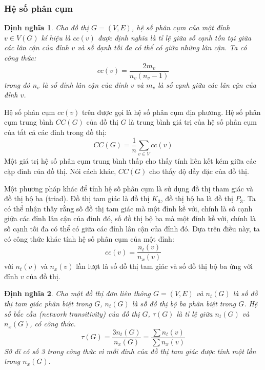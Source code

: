 \documentclass[14pt, oneside, a4paper, openany]{scrartcl}
\newtheorem{definition}{Định nghĩa}[section]
\begin{document}
\subsubsection{Hệ số phân cụm}
\begin{definition}
	\cite{complexnetwork}Cho đồ thị $G = (V,E)$, hệ số phân cụm  của một đỉnh $v \in V(G)$ kí hiệu là $cc(v)$ được định nghĩa là tỉ lệ giữa số cạnh tồn tại giữa các lân cận của đỉnh $v$ và số dạnh tối đa có thể có giữa những lân cận. Ta có công thức:
	\begin{equation}
		cc(v) = \frac{2m_v}{n_v(n_v-1)}
	\end{equation}
	trong đó $n_v$ là số đỉnh lân cận của đỉnh $v$ và $m_v$ là số cạnh giữa các lân cận của đỉnh $v$.
\end{definition}

Hệ số phân cụm $cc(v)$ trên được gọi là hệ số phân cụm địa phương. Hệ số phân cụm trung bình $CC(G)$ của đồ thị $G$ là trung bình giá trị của hệ số phân cụm của tất cả các đỉnh trong đồ thị:
\begin{equation}
	CC(G) = \frac{1}{n}\sum_{v \in V}cc(v)
\end{equation}
Một giá trị hệ số phân cụm trung bình thấp cho thấy tính liên kết kém giữa các cặp đỉnh của đồ thị. Nói cách khác, $CC(G)$ cho thấy độ dầy đặc của đồ thị.

Một phương pháp khác để tính hệ số phân cụm là sử dụng đồ thị tham giác và đồ thị bộ ba (triad). Đồ thị tam giác là đồ thị $K_3$, đồ thị bộ ba là đồ thị $P_3$. Ta có thể nhận thấy rằng số đồ thị tam giác mà một đỉnh kề với, chính là số cạnh giữa các đỉnh lân cận của đỉnh đó, số đồ thị bộ ba mà một đỉnh kề với, chính là số cạnh tối đa có thể có giữa các đỉnh lân cận của đỉnh đó.
Dựa trên điều này, ta có công thức khác tính hệ số phân cụm của một đỉnh:
\begin{equation}
	cc(v) = \frac{n_t(v)}{n_x(v)}
\end{equation}
với $n_t(v)$ và $n_x(v)$ lần lượt là số đồ thị tam giác và số đồ thị bộ ba ứng với đỉnh $v$ của đồ thị.

\begin{definition}
	\cite{complexnetwork} Cho một đồ thị đơn liên thông $G = (V,E)$ và $n_t(G)$ là số đồ thị tam giác phân biệt trong $G$, $n_t(G)$ là số đồ thị bộ ba phân biệt trong $G$. Hệ số bắc cầu  (network transitivity) của đồ thị $G$, $\tau(G)$ là tỉ lệ giữa $n_t(G)$ và $n_x(G)$, có công thức.
	\begin{equation}
		\tau(G) = \frac{3n_t(G)}{n_x(G)} = \frac{\sum n_t(v)}{\sum n_x(v)}
	\end{equation}
	Sở dĩ có số 3 trong công thức vì mỗi đỉnh của đồ thị tam giác được tính một lần trong $n_x(G)$.
\end{definition}
\end{document}
